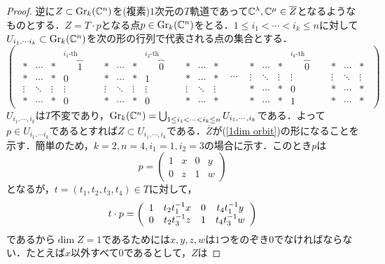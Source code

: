 \begin{proof}
  逆に$Z\subset\text{Gr}_k(\mathbb{C}^n)$を(複素)$1$次元の$T$軌道であって$\mathbb{C}^\lambda,\mathbb{C}^\mu\in\overline{Z}$となるようなものとする．$Z=T\cdot p$となる点$p\in\text{Gr}_k(\mathbb{C}^n)$をとる．$1\leq i_1<\cdots <i_k\leq n$に対して$U_{i_1,\cdots i_k}\subset\text{Gr}_k(\mathbb{C}^n)$を次の形の行列で代表される点の集合とする．
  \begin{equation}\label{chart of grassmannian}
    \left(\begin{array}{ccc}
      {\begin{array}{ccccccccccc}
      * & \cdots & * & \overbrace{1}^{i_1\text{-th column}} & * & \cdots & * & \overbrace{0}^{i_{2}\text{-th column}} & * & \cdots & *\\
      * & \cdots & * & 0 & * & \cdots & * & 1 & * & \cdots & *\\
      \vdots & \ddots & \vdots & \vdots & \vdots & \ddots & \vdots & \vdots & \vdots & \ddots & \vdots\\
      * & \cdots & * & 0 & * & \cdots & * & 0 & * & \cdots & * 
      \end{array}} & \cdots & 
      {\begin{array}{ccccccc}
      * & \cdots & * & \overbrace{0}^{i_{k}\text{-th column}} & * &\cdots & *\\
      \vdots & \ddots & \vdots & \vdots & \vdots & \ddots & \vdots\\
      * & \cdots & * & 0 & * & \cdots & *\\
      * & \cdots & * & 1 & * & \cdots & *
      \end{array}}
    \end{array}\right)
  \end{equation}
  $U_{i_1,\cdots,i_k}$は$T$不変であり，$\text{Gr}_k(\mathbb{C}^n)=\bigcup_{1\leq i_1<\cdots<i_k\leq n}U_{i_1,\cdots,i_k}$である．よって$p\in U_{i_1,\cdots i_k}$であるとすれば$Z\subset U_{i_1,\cdots,i_k}$である．$\overline{Z}$が(\ref{1dim orbit})の形になることを示す．簡単のため，$k=2,n=4,i_1=1,i_2=3$の場合に示す．このとき$p$は
  \[
  p=\left(\begin{array}{cccc}
    1 & x & 0 & y \\
    0 & z & 1 & w
  \end{array}\right)
  \]
  となるが，$t=(t_1,t_2,t_3,t_4)\in T$に対して，
  \[
  t\cdot p = \left(\begin{array}{cccc}
    1 & t_2t_1^{-1}x & 0 & t_4t_1^{-1}y \\
    0 & t_2t_3^{-1}z & 1 & t_4t_3^{-1}w 
  \end{array}\right)
  \]
  であるから$\dim Z=1$であるためには$x,y,z,w$は$1$つをのぞき$0$でなければならない．たとえば$x$以外すべて$0$であるとして，$Z$は

\end{proof}
